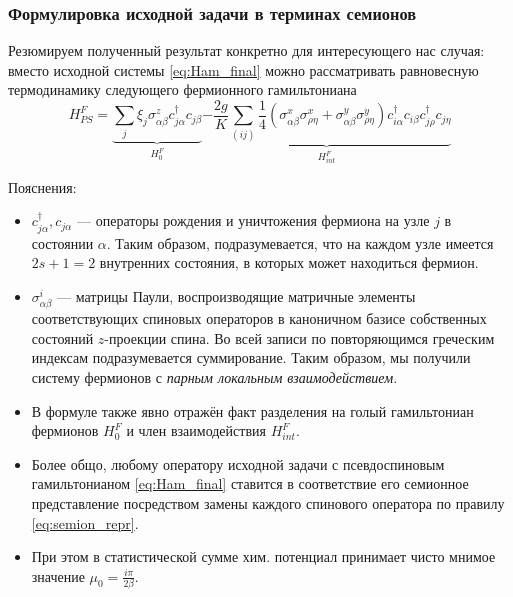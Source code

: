 \subsubsection{Формулировка исходной задачи в терминах семионов}
Резюмируем полученный результат конкретно для интересующего нас случая: вместо исходной системы \eqref{eq:Ham_final} можно рассматривать равновесную термодинамику следующего фермионного гамильтониана
\begin{equation}
	\label{eq:Ham_semion}
	H_{PS}^F = \underset{H^F_0}{\underbrace{ \sum_{j} \xi_j \sigma^z_{\alpha \beta} c^\dagger_{j\alpha} c_{j\beta} }} \underset{H^F_{int}}{\underbrace{ - \frac{2g}{K} \sum_{(ij)} \frac{1}{4} \left( \sigma^x_{\alpha \beta} \sigma^x_{\rho \eta} + \sigma^y_{\alpha \beta} \sigma^y_{\rho \eta} \right) c^\dagger_{i\alpha} c_{i\beta} c^\dagger_{j\rho} c_{j\eta} }}
\end{equation}

Пояснения:
\begin{itemize}
	\item $c^\dagger_{j\alpha},  c_{j\alpha}$ --- операторы рождения и уничтожения фермиона на узле $j$ в состоянии $\alpha$. Таким образом, подразумевается, что на каждом узле имеется $2s+1 = 2$ внутренних состояния, в которых может находиться фермион. 
	
	\item $\sigma^i_{\alpha\beta}$ --- матрицы Паули, воспроизводящие матричные элементы соответствующих спиновых операторов в каноничном базисе собственных состояний $z$-проекции спина. Во всей записи по повторяющимся греческим индексам подразумевается суммирование. Таким образом, мы получили систему фермионов с \textit{парным локальным взаимодействием}.
	
	\item В формуле также явно отражён факт разделения на голый гамильтониан фермионов $H^F_0$ и член взаимодействия $H^F_{int}$.
	
	\item Более общо, любому оператору исходной задачи с псевдоспиновым гамильтонианом \eqref{eq:Ham_final} ставится в соответствие его семионное представление посредством замены каждого спинового оператора по правилу \eqref{eq:semion_repr}.
	
	\item При этом в статистической сумме хим. потенциал принимает чисто мнимое значение $\mu_0 = \frac{i \pi}{2 \beta}$.
\end{itemize}


